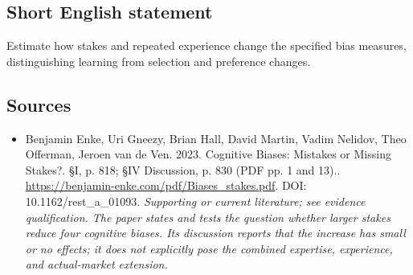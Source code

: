 \documentclass[11pt]{article}
\begin{document}
\subsection{Short English statement}
Estimate how stakes and repeated experience change the specified bias measures, distinguishing learning from selection and preference changes.

\subsection{Sources}
\begin{itemize}\raggedright
\item[\textnormal{[S1]}]\hypertarget{source:30007584:1}{} Benjamin Enke, Uri Gneezy, Brian Hall, David Martin, Vadim Nelidov, Theo Offerman, Jeroen van de Ven. 2023. Cognitive Biases: Mistakes or Missing Stakes?. §I, p. 818; §IV Discussion, p. 830 (PDF pp. 1 and 13)..
\url{https://benjamin-enke.com/pdf/Biases_stakes.pdf}.
DOI: 10.1162/rest\_a\_01093.
{\small\textit{Supporting or current literature; see evidence qualification. The paper states and tests the question whether larger stakes reduce four cognitive biases. Its discussion reports that the increase has small or no effects; it does not explicitly pose the combined expertise, experience, and actual-market extension.}}
\end{itemize}
\end{document}
